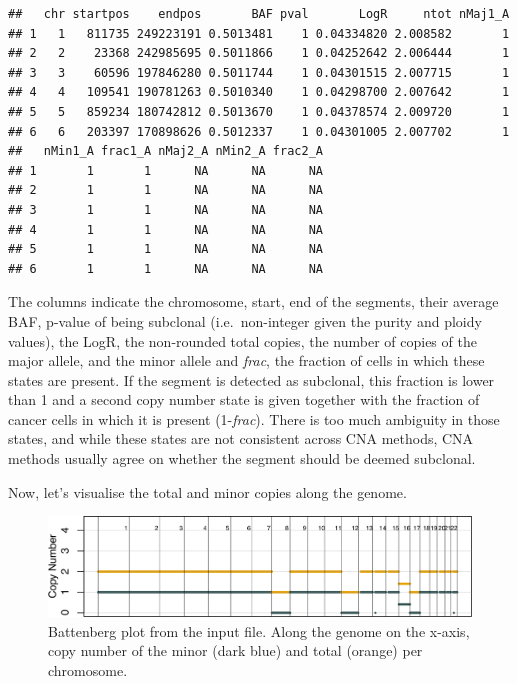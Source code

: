 \documentclass[]{article}
\begin{document}
\begin{verbatim}
##   chr startpos    endpos       BAF pval       LogR     ntot nMaj1_A
## 1   1   811735 249223191 0.5013481    1 0.04334820 2.008582       1
## 2   2    23368 242985695 0.5011866    1 0.04252642 2.006444       1
## 3   3    60596 197846280 0.5011744    1 0.04301515 2.007715       1
## 4   4   109541 190781263 0.5010340    1 0.04298700 2.007642       1
## 5   5   859234 180742812 0.5013670    1 0.04378574 2.009720       1
## 6   6   203397 170898626 0.5012337    1 0.04301005 2.007702       1
##   nMin1_A frac1_A nMaj2_A nMin2_A frac2_A
## 1       1       1      NA      NA      NA
## 2       1       1      NA      NA      NA
## 3       1       1      NA      NA      NA
## 4       1       1      NA      NA      NA
## 5       1       1      NA      NA      NA
## 6       1       1      NA      NA      NA
\end{verbatim}

The columns indicate the chromosome, start, end of the segments, their
average BAF, p-value of being subclonal (i.e.~non-integer given the
purity and ploidy values), the LogR, the non-rounded total copies, the
number of copies of the major allele, and the minor allele and
\emph{frac}, the fraction of cells in which these states are present. If
the segment is detected as subclonal, this fraction is lower than 1 and
a second copy number state is given together with the fraction of cancer
cells in which it is present (1-\emph{frac}). There is too much
ambiguity in those states, and while these states are not consistent
across CNA methods, CNA methods usually agree on whether the segment
should be deemed subclonal.

Now, let's visualise the total and minor copies along the genome.

\begin{figure}

{\centering \includegraphics{src_guide_files/figure-latex/fig2-1} 

}

\caption{\label{fig2} Battenberg plot from the input file. Along the genome on the x-axis, copy number of the minor (dark blue) and total (orange) per chromosome. }\label{fig:fig2}
\end{figure}
\end{document}
